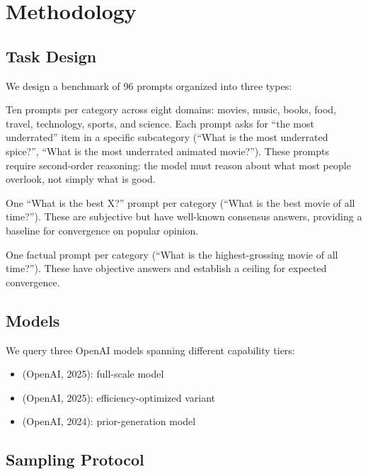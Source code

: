 \section{Methodology}
\label{sec:method}

\subsection{Task Design}
\label{sec:task}

We design a benchmark of 96 prompts organized into three types:

 Ten prompts per category across eight domains: movies, music, books, food, travel, technology, sports, and science. Each prompt asks for ``the most underrated'' item in a specific subcategory (\eg ``What is the most underrated spice?'', ``What is the most underrated animated movie?''). These prompts require second-order reasoning: the model must reason about what most people overlook, not simply what is good.

 One ``What is the best X?'' prompt per category (\eg ``What is the best movie of all time?''). These are subjective but have well-known consensus answers, providing a baseline for convergence on popular opinion.

 One factual prompt per category (\eg ``What is the highest-grossing movie of all time?''). These have objective answers and establish a ceiling for expected convergence.

\subsection{Models}

We query three OpenAI models spanning different capability tiers:
\begin{itemize}[leftmargin=*,itemsep=0pt,topsep=0pt]
    \item \gptfull (OpenAI, 2025): full-scale model
    \item \gptmini (OpenAI, 2025): efficiency-optimized variant
    \item \gptfo (OpenAI, 2024): prior-generation model
\end{itemize}

\subsection{Sampling Protocol}

